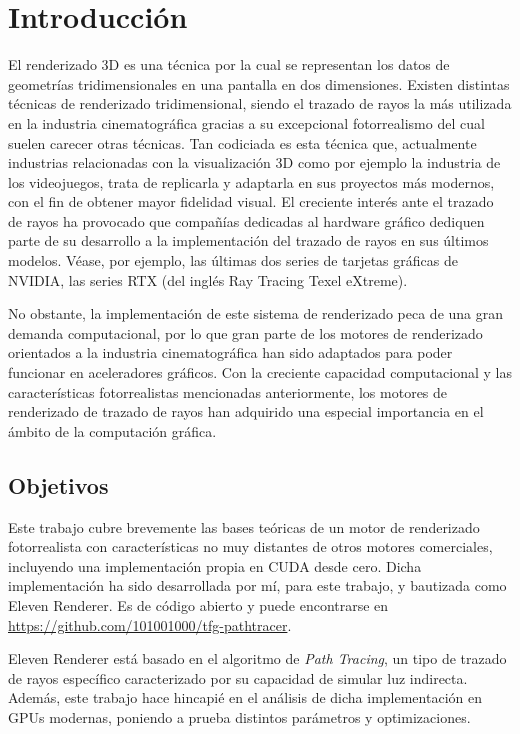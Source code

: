 \chapter{Introducción}
\label{chap:1}	

El renderizado 3D es una técnica por la cual se representan los datos de geometrías tridimensionales en una pantalla en dos dimensiones. Existen distintas técnicas de renderizado tridimensional, siendo el trazado de rayos la más utilizada en la industria cinematográfica gracias a su excepcional fotorrealismo del cual suelen carecer otras técnicas. Tan codiciada es esta técnica que, actualmente industrias relacionadas con la visualización 3D como por ejemplo la industria de los videojuegos, trata de replicarla y adaptarla en sus proyectos más modernos, con el fin de obtener mayor fidelidad visual.
El creciente interés ante el trazado de rayos ha provocado que compañías dedicadas al hardware gráfico dediquen parte de su desarrollo a la implementación del trazado de rayos en sus últimos modelos. Véase, por ejemplo, las últimas dos series de tarjetas gráficas de NVIDIA, las series RTX (del inglés Ray Tracing Texel eXtreme).

No obstante, la implementación de este sistema de renderizado peca de una gran demanda computacional, por lo que gran parte de los motores de renderizado orientados a la industria cinematográfica han sido adaptados para poder funcionar en aceleradores gráficos. Con la creciente capacidad computacional y las características fotorrealistas mencionadas anteriormente, los motores de renderizado de trazado de rayos han adquirido una especial importancia en el ámbito de la computación gráfica.

\section{Objetivos}
	
Este trabajo cubre brevemente las bases teóricas de un motor de renderizado fotorrealista con características no muy distantes de otros motores comerciales, incluyendo una implementación propia en CUDA desde cero. Dicha implementación ha sido desarrollada por mí, para este trabajo, y bautizada como Eleven Renderer. Es de código abierto y puede encontrarse en \url{https://github.com/101001000/tfg-pathtracer}.

Eleven Renderer está basado en el algoritmo de \emph{Path Tracing}, un tipo de trazado de rayos específico caracterizado por su capacidad de simular luz indirecta. Además, este trabajo hace hincapié en el análisis de dicha implementación en GPUs modernas, poniendo a prueba distintos parámetros y optimizaciones.
	
